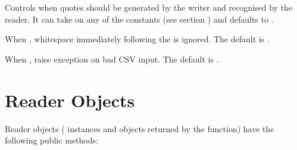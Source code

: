 \documentclass[letterpaper,10pt,english]{sphinxmanual}
\begin{document}

\begin{fulllineitems}
\label{\detokenize{csv:csv.Dialect.quoting}}
Controls when quotes should be generated by the writer and recognised by the
reader.  It can take on any of the  constants (see section
{\hyperref[\detokenize{csv:csv-contents}]{}}) and defaults to {\hyperref[\detokenize{csv:csv.QUOTE_MINIMAL}]{}}.

\end{fulllineitems}


\begin{fulllineitems}
\label{\detokenize{csv:csv.Dialect.skipinitialspace}}
When , whitespace immediately following the  is ignored.
The default is .

\end{fulllineitems}


\begin{fulllineitems}
\label{\detokenize{csv:csv.Dialect.strict}}
When , raise exception {\hyperref[\detokenize{csv:csv.Error}]{}} on bad CSV input.
The default is .

\end{fulllineitems}



\section{Reader Objects}
\label{\detokenize{csv:reader-objects}}
Reader objects ({\hyperref[\detokenize{csv:csv.DictReader}]{}} instances and objects returned by the
{\hyperref[\detokenize{csv:csv.reader}]{}} function) have the following public methods:
\end{document}
